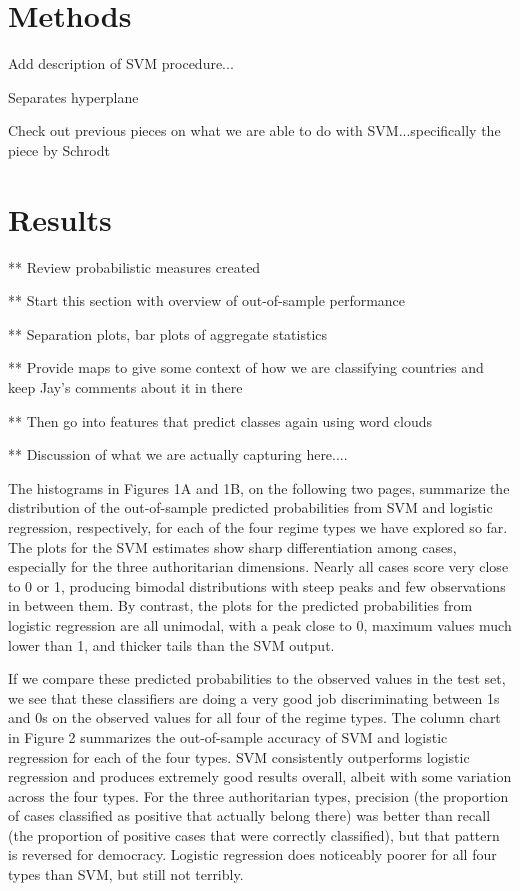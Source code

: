 \documentclass[pdftex,12pt,fullpage,oneside]{amsart}
\begin{document}
\section{Methods}

Add description of SVM procedure...

Separates hyperplane

Check out previous pieces on what we are able to do with SVM...specifically the piece by Schrodt

\section{Results}

** Review probabilistic measures created

** Start this section with overview of out-of-sample performance

** Separation plots, bar plots of aggregate statistics

** Provide maps to give some context of how we are classifying countries and keep Jay's comments about it in there

** Then go into features that predict classes again using word clouds

** Discussion of what we are actually capturing here....

The histograms in Figures 1A and 1B, on the following two pages, summarize the distribution of the out-of-sample predicted probabilities from SVM and logistic regression, respectively, for each of the four regime types we have explored so far.  The plots for the SVM estimates show sharp differentiation among cases, especially for the three authoritarian dimensions. Nearly all cases score very close to 0 or 1, producing bimodal distributions with steep peaks and few observations in between them. By contrast, the plots for the predicted probabilities from logistic regression are all unimodal, with a peak close to 0, maximum values much lower than 1, and thicker tails than the SVM output. 

If we compare these predicted probabilities to the observed values in the test set, we see that these classifiers are doing a very good job discriminating between 1s and 0s on the observed values for all four of the regime types. The column chart in Figure 2 summarizes the out-of-sample accuracy of SVM and logistic regression for each of the four types. SVM consistently outperforms logistic regression and produces extremely good results overall, albeit with some variation across the four types. For the three authoritarian types, precision (the proportion of cases classified as positive that actually belong there) was better than recall (the proportion of positive cases that were correctly classified), but that pattern is reversed for democracy. Logistic regression does noticeably poorer for all four types than SVM, but still not terribly.
\end{document}
